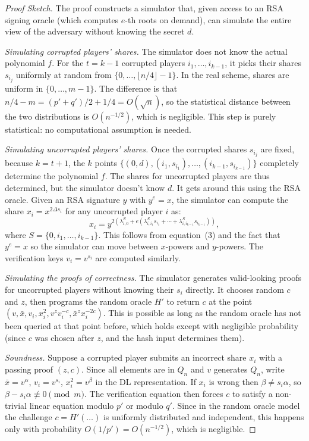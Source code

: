 \begin{proof}[Proof Sketch]
The proof constructs a simulator that, given access to an RSA signing oracle (which
computes $e$-th roots on demand), can simulate the entire view of the adversary without
knowing the secret $d$.

\medskip
\noindent\textit{Simulating corrupted players' shares.}
The simulator does not know the actual polynomial $f$. For the $t = k-1$ corrupted
players $i_1, \ldots, i_{k-1}$, it picks their shares $s_{i_j}$ uniformly at random from
$\{0, \ldots, \lfloor n/4 \rfloor - 1\}$. In the real scheme, shares are uniform in
$\{0, \ldots, m-1\}$. The difference is that $n/4 - m = (p' + q')/2 + 1/4 = O(\sqrt{n})$,
so the statistical distance between the two distributions is $O(n^{-1/2})$, which is
negligible. This step is purely statistical: no computational assumption is needed.

\medskip
\noindent\textit{Simulating uncorrupted players' shares.}
Once the corrupted shares $s_{i_j}$ are fixed, because $k = t+1$, the $k$ points
$\{(0, d), (i_1, s_{i_1}), \ldots, (i_{k-1}, s_{i_{k-1}})\}$ completely determine the
polynomial $f$. The shares for uncorrupted players are thus determined, but the simulator
doesn't know $d$. It gets around this using the RSA oracle. Given an RSA signature $y$
with $y^e = x$, the simulator can compute the share $x_i = x^{2\Delta s_i}$ for any
uncorrupted player $i$ as:
\[
    x_i = y^{2\left(\lambda_{i,0}^{S} + e\left(\lambda_{i,i_1}^{S} s_{i_1} + \cdots +
    \lambda_{i,i_{k-1}}^{S} s_{i_{k-1}}\right)\right)},
\]
where $S = \{0, i_1, \ldots, i_{k-1}\}$. This follows from equation~(3) and the fact
that $y^e = x$ so the simulator can move between $x$-powers and $y$-powers. The
verification keys $v_i = v^{s_i}$ are computed similarly.

\medskip
\noindent\textit{Simulating the proofs of correctness.}
The simulator generates valid-looking proofs for uncorrupted players without knowing their
$s_i$ directly. It chooses random $c$ and $z$, then programs the random oracle $H'$ to
return $c$ at the point $(v, \bar{x}, v_i, x_i^2, v^z v_i^{-c}, \bar{x}^z x_i^{-2c})$.
This is possible as long as the random oracle has not been queried at that point before,
which holds except with negligible probability (since $c$ was chosen after $z$, and the
hash input determines them).

\medskip
\noindent\textit{Soundness.}
Suppose a corrupted player submits an incorrect share $x_i$ with a passing proof $(z, c)$.
Since all elements are in $Q_n$ and $v$ generates $Q_n$, write $\bar{x} = v^\alpha$,
$v_i = v^{s_i}$, $x_i^2 = v^\beta$ in the DL representation. If $x_i$ is wrong then
$\beta \neq s_i \alpha$, so $\beta - s_i\alpha \not\equiv 0 \pmod{m}$. The verification
equation then forces $c$ to satisfy a non-trivial linear equation modulo $p'$ or modulo
$q'$. Since in the random oracle model the challenge $c = H'(\ldots)$ is uniformly
distributed and independent, this happens only with probability $O(1/p') = O(n^{-1/2})$,
which is negligible.


\end{proof}

